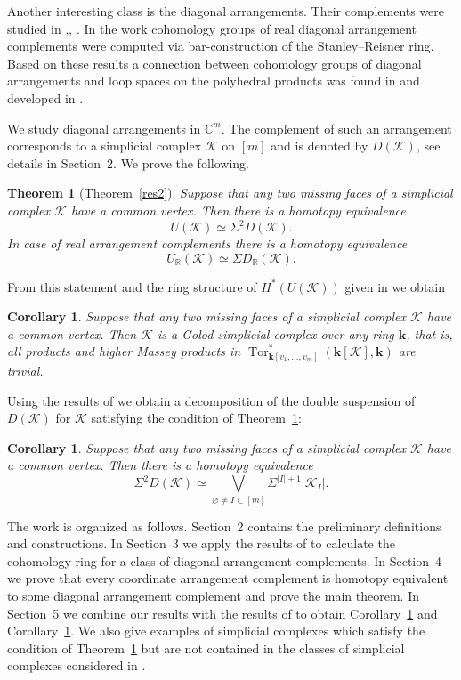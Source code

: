 \documentclass[a4paper,12pt]{amsart}
\newcommand{\K}{\mathcal K}
\newcommand{\RR}{\mathbb R}
\newcommand{\CC}{\mathbb C}
\newcommand{\kk}{\mathbf{k}}
\newtheorem{corollary}[formula]{Corollary}
\newtheorem{theorem}[formula]{Theorem}
\theoremstyle{definition}
\theoremstyle{remark}
\numberwithin{equation}{section}
\DeclareMathOperator{\Tor}{Tor}
\begin{document}
Another interesting class is the diagonal arrangements. Their complements were studied in \cite{PRW},\cite{BP00}, \cite{Dobr}. 
In the work \cite{PRW} cohomology groups of real diagonal arrangement
complements were computed via bar-construction of the Stanley--Reisner ring.
Based on these results a connection between cohomology groups of diagonal arrangements and loop spaces on
the polyhedral products was found in \cite{BP00} and developed in \cite{Dobr}.

We study diagonal arrangements in $\CC^m$. The complement of such an arrangement corresponds to a simplicial complex $\K$ on $[m]$ and is denoted by $D(\K)$,
see details in Section~2. We prove the following.
\begin{theorem}[Theorem~\ref{res2}]\label{intro-thrm-1}
	Suppose that any two missing faces of a simplicial complex $\K$ have a common vertex. Then there is a homotopy equivalence
	$$U(\K) \simeq \Sigma^2 D(\K).$$ 
	In case of real arrangement complements there is a homotopy equivalence
	$$U_{\RR}(\K) \simeq \Sigma D_{\RR}(\K).$$
\end{theorem}
From this statement and the ring structure of $H^*(U(\K))$ given in \cite{BP} we obtain
\begin{corollary}\label{intro-cor-1}
	Suppose that any two missing faces of a simplicial complex $\K$ have a common vertex. Then $\K$ is a Golod simplicial complex over any ring $\kk$, that is,
	all products and higher Massey products in $\Tor^*_{\kk[v_1, \dots, v_m]}(\kk[\K], \kk)$ are trivial.
\end{corollary}
Using the results of \cite{IK} we obtain a decomposition of the double suspension of $D(\K)$ for $\K$ satisfying the condition of Theorem~\ref{intro-thrm-1}:
\begin{corollary}\label{intro-cor-2}
	Suppose that any two missing faces of a simplicial complex $\K$ have a common vertex.
    Then there is a homotopy equivalence
	$$\Sigma^2 D(\K) \simeq \bigvee_{\varnothing \neq I \subset [m]} \Sigma^{|I| + 1} |\K_I|.$$
\end{corollary}

The work is organized as follows. Section~2 contains the preliminary definitions and constructions.
In Section~3 we apply the results of \cite{dLS} to calculate the cohomology ring for a class of diagonal arrangement complements. 
In Section~4 we prove that every coordinate arrangement complement is homotopy equivalent to some diagonal arrangement complement and prove the main
theorem. In Section~5 we combine our results with the results of \cite{IK} to obtain Corollary~\ref{intro-cor-1} and Corollary~\ref{intro-cor-2}.
We also give examples of simplicial complexes which satisfy the condition of Theorem~\ref{intro-thrm-1} but are not contained in the classes of simplicial complexes considered in \cite{IK}.
\end{document}
